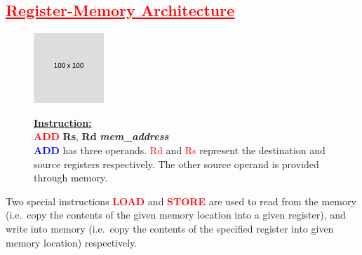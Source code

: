 \documentclass[
  16pt,
  a4paper,
]{report}
\begin{document}
\subsection{\texorpdfstring{\textcolor{red}{\underline{Register-Memory Architecture}}}{}}\label{section-2}

\begin{figure}[H]

\begin{minipage}{0.40\linewidth}

\includegraphics{index_files/mediabag/FiKGhYhhIWJYiBgWIoaF.png}\end{minipage}%
%
\begin{minipage}{0.60\linewidth}

\begin{tcolorbox}[colback=boxbodycol, colframe=boxbodycol]
\textbf{\underline{Instruction:}}\\
\textcolor{red}{\textbf{ADD}} \textbf{Rs}, \textbf{Rd}
\textbf{\emph{mem\_address}}\\
\textcolor{blue}{\textbf{ADD}} has three operands. \textcolor{red}{Rd}
and \textcolor{red}{Rs} represent the destination and source registers
respectively. The other source operand is provided through memory.

\end{tcolorbox}

\end{minipage}%

\end{figure}%

\begin{tcolorbox}[colback=boxbodycol, colframe=boxbodycol]
Two special instructions \textcolor{red}{\textbf{LOAD}} and
\textcolor{red}{\textbf{STORE}} are used to read from the memory
(i.e.~copy the contents of the given memory location into a given
register), and write into memory (i.e.~copy the contents of the
specified register into given memory location) respectively.

\end{tcolorbox}
\end{document}
